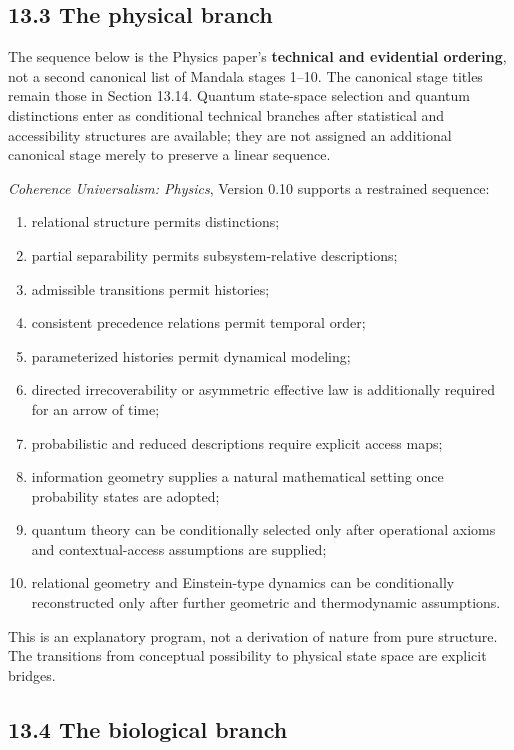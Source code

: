 \documentclass[
  11pt,
]{article}
\providecommand{\tightlist}{%
  \setlength{\itemsep}{0pt}\setlength{\parskip}{0pt}}
\begin{document}
\subsection{13.3 The physical branch}\label{the-physical-branch}

The sequence below is the Physics paper's \textbf{technical and
evidential ordering}, not a second canonical list of Mandala stages
1--10. The canonical stage titles remain those in Section 13.14. Quantum
state-space selection and quantum distinctions enter as conditional
technical branches after statistical and accessibility structures are
available; they are not assigned an additional canonical stage merely to
preserve a linear sequence.

\emph{Coherence Universalism: Physics}, Version 0.10 supports a
restrained sequence:

\begin{enumerate}
\def\labelenumi{\arabic{enumi}.}
\tightlist
\item
  relational structure permits distinctions;
\item
  partial separability permits subsystem-relative descriptions;
\item
  admissible transitions permit histories;
\item
  consistent precedence relations permit temporal order;
\item
  parameterized histories permit dynamical modeling;
\item
  directed irrecoverability or asymmetric effective law is additionally
  required for an arrow of time;
\item
  probabilistic and reduced descriptions require explicit access maps;
\item
  information geometry supplies a natural mathematical setting once
  probability states are adopted;
\item
  quantum theory can be conditionally selected only after operational
  axioms and contextual-access assumptions are supplied;
\item
  relational geometry and Einstein-type dynamics can be conditionally
  reconstructed only after further geometric and thermodynamic
  assumptions.
\end{enumerate}

This is an explanatory program, not a derivation of nature from pure
structure. The transitions from conceptual possibility to physical state
space are explicit bridges.

\subsection{13.4 The biological branch}\label{the-biological-branch}
\end{document}
